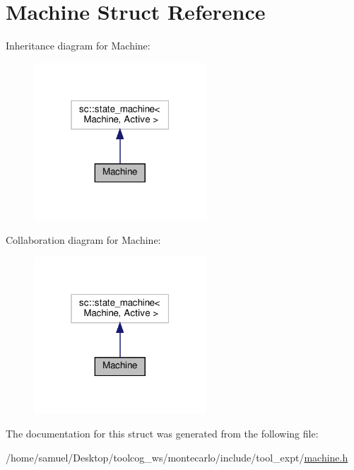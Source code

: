 \hypertarget{structMachine}{}\section{Machine Struct Reference}
\label{structMachine}


Inheritance diagram for Machine\+:
\nopagebreak
\begin{figure}[H]
\begin{center}
\leavevmode
\includegraphics[width=183pt]{structMachine__inherit__graph}
\end{center}
\end{figure}


Collaboration diagram for Machine\+:
\nopagebreak
\begin{figure}[H]
\begin{center}
\leavevmode
\includegraphics[width=183pt]{structMachine__coll__graph}
\end{center}
\end{figure}


The documentation for this struct was generated from the following file\+:\begin{DoxyCompactItemize}
\item 
/home/samuel/\+Desktop/toolcog\+\_\+ws/montecarlo/include/tool\+\_\+expt/\hyperlink{machine_8h}{machine.\+h}\end{DoxyCompactItemize}
